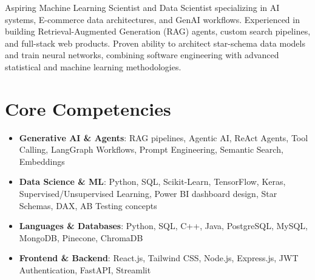 \documentclass[11pt,a4paper,sans]{moderncv}
\begin{document}
\makecvtitle

\vspace{6pt}
\small{Aspiring Machine Learning Scientist and Data Scientist specializing in AI systems, E-commerce data architectures, and GenAI workflows. Experienced in building Retrieval-Augmented Generation (RAG) agents, custom search pipelines, and full-stack web products. Proven ability to architect star-schema data models and train neural networks, combining software engineering with advanced statistical and machine learning methodologies.}

\section{Core Competencies}
\vspace{1pt}
\begin{itemize}
\item \textbf{Generative AI \& Agents}: RAG pipelines, Agentic AI, ReAct Agents, Tool Calling, LangGraph Workflows, Prompt Engineering, Semantic Search, Embeddings
\item \textbf{Data Science \& ML}: Python, SQL, Scikit-Learn, TensorFlow, Keras, Supervised/Unsupervised Learning, Power BI dashboard design, Star Schemas, DAX, AB Testing concepts
\item \textbf{Languages \& Databases}: Python, SQL, C++, Java, PostgreSQL, MySQL, MongoDB, Pinecone, ChromaDB
\item \textbf{Frontend \& Backend}: React.js, Tailwind CSS, Node.js, Express.js, JWT Authentication, FastAPI, Streamlit
\end{itemize}
\end{document}

